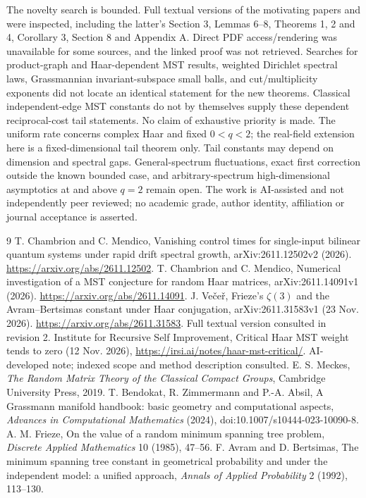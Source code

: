 \documentclass[11pt]{article}
\begin{document}
The novelty search is bounded. Full textual versions of the motivating papers and \cite{Vecer} were inspected, including the latter's Section 3, Lemmas 6--8, Theorems 1, 2 and 4, Corollary 3, Section 8 and Appendix A. Direct PDF access/rendering was unavailable for some sources, and the linked \cite{IRSI} proof was not retrieved. Searches for product-graph and Haar-dependent MST results, weighted Dirichlet spectral laws, Grassmannian invariant-subspace small balls, and cut/multiplicity exponents did not locate an identical statement for the new theorems. Classical independent-edge MST constants \cite{Frieze,Avram} do not by themselves supply these dependent reciprocal-cost tail statements. No claim of exhaustive priority is made. The uniform rate concerns complex Haar and fixed $0<q<2$; the real-field extension here is a fixed-dimensional tail theorem only. Tail constants may depend on dimension and spectral gaps. General-spectrum fluctuations, exact first correction outside the known bounded case, and arbitrary-spectrum high-dimensional asymptotics at and above $q=2$ remain open. The work is AI-assisted and not independently peer reviewed; no academic grade, author identity, affiliation or journal acceptance is asserted.

\begin{thebibliography}{9}
 T. Chambrion and C. Mendico, Vanishing control times for single-input bilinear quantum systems under rapid drift spectral growth, arXiv:2611.12502v2 (2026). \url{https://arxiv.org/abs/2611.12502}.
 T. Chambrion and C. Mendico, Numerical investigation of a MST conjecture for random Haar matrices, arXiv:2611.14091v1 (2026). \url{https://arxiv.org/abs/2611.14091}.
 J. Ve\v{c}e\v{r}, Frieze's $\zeta(3)$ and the Avram--Bertsimas constant under Haar conjugation, arXiv:2611.31583v1 (23 Nov. 2026). \url{https://arxiv.org/abs/2611.31583}. Full textual version consulted in revision 2.
 Institute for Recursive Self Improvement, Critical Haar MST weight tends to zero (12 Nov. 2026), \url{https://irsi.ai/notes/haar-mst-critical/}. AI-developed note; indexed scope and method description consulted.
 E. S. Meckes, \emph{The Random Matrix Theory of the Classical Compact Groups}, Cambridge University Press, 2019.
 T. Bendokat, R. Zimmermann and P.-A. Absil, A Grassmann manifold handbook: basic geometry and computational aspects, \emph{Advances in Computational Mathematics} (2024), doi:10.1007/s10444-023-10090-8.
 A. M. Frieze, On the value of a random minimum spanning tree problem, \emph{Discrete Applied Mathematics} 10 (1985), 47--56.
 F. Avram and D. Bertsimas, The minimum spanning tree constant in geometrical probability and under the independent model: a unified approach, \emph{Annals of Applied Probability} 2 (1992), 113--130.
\end{thebibliography}
\end{document}
